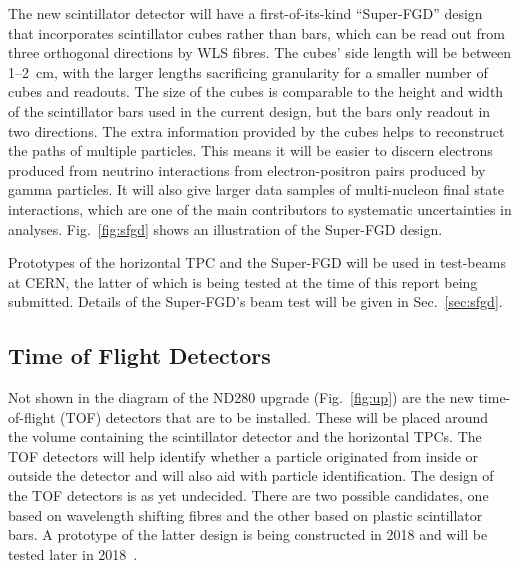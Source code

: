 \documentclass[aps,pra,12pt,notitlepage,tightenlines]{revtex4-1}
\begin{document}
The new scintillator detector will have a first-of-its-kind ``Super-FGD'' design that incorporates scintillator cubes rather than bars, which can be read out from three orthogonal directions by WLS fibres. The cubes' side length will be between 1--2~cm, with the larger lengths sacrificing granularity for a smaller number of cubes and readouts. The size of the cubes is comparable to the height and width of the scintillator bars used in the current design, but the bars only readout in two directions. The extra information provided by the cubes helps to reconstruct the paths of multiple particles. This means it will be easier to discern electrons produced from neutrino interactions from electron-positron pairs produced by gamma particles. It will also give larger data samples of multi-nucleon final state interactions, which are one of the main contributors to systematic uncertainties in analyses. Fig.~\ref{fig:sfgd}
shows an illustration of the Super-FGD design.

Prototypes of the horizontal TPC and the Super-FGD will be used in test-beams at CERN, the latter of which is being tested at the time of this report being submitted. Details of the Super-FGD's beam test will be given in Sec.\ \ref{sec:sfgd}.

\subsection{Time of Flight Detectors}
Not shown in the diagram of the ND280 upgrade (Fig.~\ref{fig:up}) are the new time-of-flight (TOF) detectors that are to be installed. These will be placed around the volume containing the scintillator detector and the horizontal TPCs. The TOF detectors will help identify whether a particle originated from inside or outside the detector and will also aid with particle identification. The design of the TOF detectors is as yet undecided. There are two possible candidates, one based on wavelength shifting fibres and the other based on plastic scintillator bars. A prototype of the latter design is being constructed in 2018 and will be tested later in 2018~\cite{Blondel:2299599}. 
\end{document}

